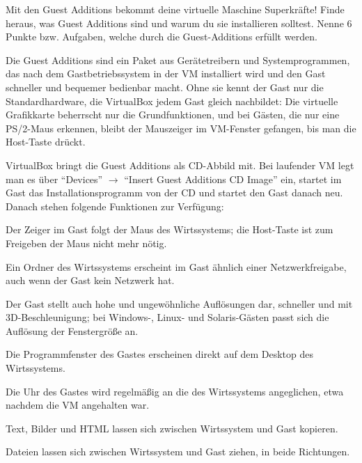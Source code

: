 \begin{aufgabe}
Mit den Guest Additions bekommt deine virtuelle Maschine Superkräfte! Finde heraus, was Guest Additions sind und warum du sie installieren solltest. Nenne 6 Punkte bzw. Aufgaben, welche durch die Guest-Additions erfüllt werden.
\end{aufgabe}
\label{sec:guestadditions}

Die Guest Additions sind ein Paket aus Gerätetreibern und Systemprogrammen, das nach dem Gastbetriebssystem in der VM installiert wird und den Gast schneller und bequemer bedienbar macht. Ohne sie kennt der Gast nur die Standardhardware, die VirtualBox jedem Gast gleich nachbildet: Die virtuelle Grafikkarte beherrscht nur die Grundfunktionen, und bei Gästen, die nur eine PS/2-Maus erkennen, bleibt der Mauszeiger im VM-Fenster gefangen, bis man die Host-Taste drückt.

VirtualBox bringt die Guest Additions als CD-Abbild  mit. Bei laufender VM legt man es über \enquote{Devices} $\rightarrow$ \enquote{Insert Guest Additions CD Image} ein, startet im Gast das Installationsprogramm von der CD und startet den Gast danach neu. Danach stehen folgende Funktionen zur Verfügung:

\begin{description}[nosep]
  \item[Mauszeigerintegration] Der Zeiger im Gast folgt der Maus des Wirtssystems; die Host-Taste ist zum Freigeben der Maus nicht mehr nötig.
  \item[Shared Folders] Ein Ordner des Wirtssystems erscheint im Gast ähnlich einer Netzwerkfreigabe, auch wenn der Gast kein Netzwerk hat.
  \item[Bessere Grafik] Der Gast stellt auch hohe und ungewöhnliche Auflösungen dar, schneller und mit 3D-Beschleunigung; bei Windows-, Linux- und Solaris-Gästen passt sich die Auflösung der Fenstergröße an.
  \item[Nahtlose Fenster] Die Programmfenster des Gastes erscheinen direkt auf dem Desktop des Wirtssystems.
  \item[Zeitabgleich] Die Uhr des Gastes wird regelmäßig an die des Wirtssystems angeglichen, etwa nachdem die VM angehalten war.
  \item[Gemeinsame Zwischenablage] Text, Bilder und HTML lassen sich zwischen Wirtssystem und Gast kopieren.
  \item[Drag and Drop] Dateien lassen sich zwischen Wirtssystem und Gast ziehen, in beide Richtungen.\end{description}

